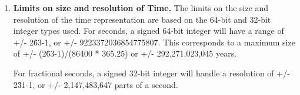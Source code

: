 
\begin{enumerate}

\item {\bf Limits on size and resolution of Time.}  The limits on the size and 
resolution of the time representation are based on the
64-bit and 32-bit integer types used.  For seconds, a signed 64-bit integer
will have a range of +/- 2\^63-1, or +/- 9223372036854775807.  This corresponds
to a maximum size of +/- (2\^63-1)/(86400 * 365.25) or +/- 292,271,023,045 
years.

For fractional seconds, a signed 32-bit integer will handle a resolution of
+/- 2\^31-1, or +/- 2,147,483,647 parts of a second.

\end{enumerate}